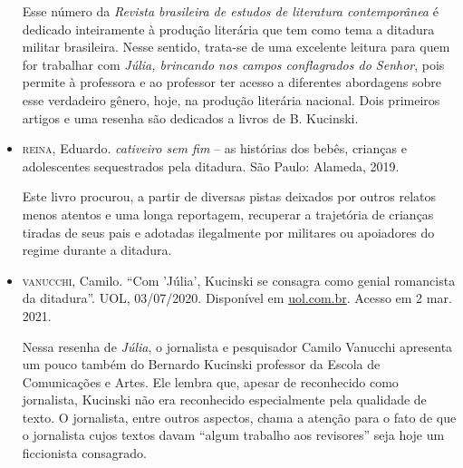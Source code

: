 \documentclass[12pt]{extarticle}
\begin{document}
\begin{itemize}
Esse número da \emph{Revista brasileira de estudos de literatura
contemporânea} é dedicado inteiramente à produção literária que tem como
tema a ditadura militar brasileira. Nesse sentido, trata-se de uma
excelente leitura para quem for trabalhar com \emph{Júlia, brincando nos
campos conflagrados do Senhor}, pois permite à professora e ao professor
ter acesso a diferentes abordagens sobre esse verdadeiro gênero, hoje,
na produção literária nacional. Dois primeiros artigos e uma resenha são
dedicados a livros de B. Kucinski.

\item \textsc{reina}, Eduardo. \emph{cativeiro sem fim} -- as histórias dos bebês,
crianças e adolescentes sequestrados pela ditadura. São Paulo: Alameda,
2019.

Este livro procurou, a partir de diversas pistas deixados por outros
relatos menos atentos e uma longa reportagem, recuperar a trajetória de
crianças tiradas de seus pais e adotadas ilegalmente por militares ou
apoiadores do regime durante a ditadura.

\item \textsc{vanucchi}, Camilo. ``Com 'Júlia', Kucinski se consagra como genial
romancista da ditadura''. UOL, 03/07/2020. Disponível em
\href{https://noticias.uol.com.br/colunas/camilo-vannuchi/2020/07/03/com-julia-kucinski-se-consagra-como-genial-romancista-da-ditadura.htm}{{uol.com.br}}.
Acesso em 2 mar. 2021.

Nessa resenha de \emph{Júlia}, o jornalista e pesquisador Camilo
Vanucchi apresenta um pouco também do Bernardo Kucinski professor da
Escola de Comunicações e Artes. Ele lembra que, apesar de reconhecido
como jornalista, Kucinski não era reconhecido especialmente pela
qualidade de texto. O jornalista, entre outros aspectos, chama a atenção
para o fato de que o jornalista cujos textos davam ``algum trabalho aos
revisores'' seja hoje um ficcionista consagrado.
\end{itemize}
\end{document}
